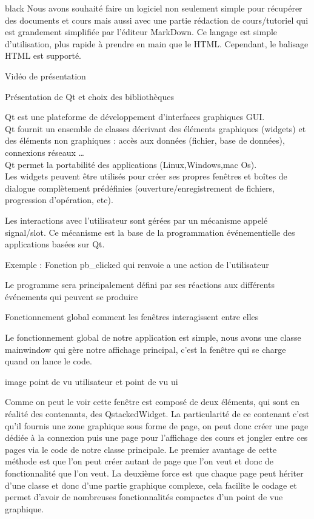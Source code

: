{\begin{items}{black}{\Bullet}
Nous avons souhaité faire un logiciel non seulement simple pour récupérer des documents et cours mais aussi avec une partie rédaction de cours/tutoriel qui est grandement simplifiée par l'éditeur MarkDown.
Ce langage est simple d'utilisation, plus rapide à prendre en main que le HTML. Cependant, le balisage HTML est supporté.

\item Vidéo de présentation


\item Présentation de Qt et choix des bibliothèques

Qt est une plateforme de développement d’interfaces graphiques GUI.\\

Qt fournit un ensemble de classes décrivant des éléments graphiques (widgets) et des éléments non graphiques : accès aux données (fichier, base de données), connexions réseaux …\\

Qt permet la portabilité des applications (Linux,Windows,mac Os).\\
Les widgets peuvent être utilisés pour créer ses propres fenêtres et boîtes de dialogue complètement prédéfinies (ouverture/enregistrement de fichiers, progression d’opération, etc). \\


Les interactions avec l’utilisateur sont gérées par un mécanisme appelé signal/slot. Ce mécanisme est la base de la programmation événementielle des applications basées sur Qt.

Exemple : Fonction pb\_clicked qui renvoie a une action de l’utilisateur

Le programme sera principalement défini par ses réactions aux différents événements qui peuvent se produire



\item Fonctionnement global comment les fenêtres interagissent entre elles

Le fonctionnement global de notre application est simple, nous avons une classe mainwindow qui gère notre affichage principal, c’est la fenêtre qui se charge quand on lance le code.

image point de vu utilisateur et point de vu ui

Comme on peut le voir cette fenêtre est composé de deux éléments, qui sont en réalité des contenants, des QstackedWidget. La particularité de ce contenant c’est qu’il fournis une zone graphique sous forme de page, on peut donc créer une page dédiée à la connexion puis une page pour l’affichage des cours et jongler entre ces pages via le code de notre classe principale.
Le premier avantage de cette méthode est que l’on peut créer autant de page que l'on veut et donc de fonctionnalité que l’on veut. La deuxième force est que chaque page peut hériter d’une classe et donc d’une partie graphique complexe, cela facilite le codage et permet d’avoir de nombreuses fonctionnalités compactes d’un point de vue graphique.




\end{items}}

